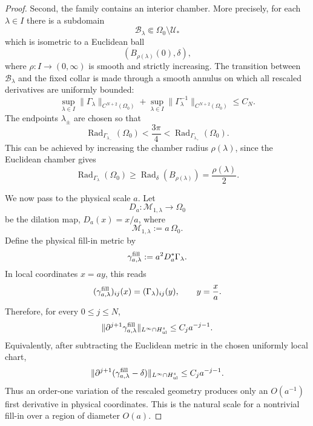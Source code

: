 \documentclass{amsart}
\begin{document}
{\begin{proof}
\noindent Second, the family contains an interior chamber. More precisely, for
each \(\lambda\in I\) there is a subdomain
\[
        \mathcal B_\lambda\Subset \Omega_0\setminus\mathcal U_*
\]
which is isometric to a Euclidean ball
\[
        (B_{\rho(\lambda)}(0),\delta),
\]
where \(\rho:I\to(0,\infty)\) is smooth and strictly increasing. The
transition between \(\mathcal B_\lambda\) and the fixed collar is made
through a smooth annulus on which all rescaled derivatives are uniformly
bounded:
\begin{equation}
\label{eq:model-uniform-bounds}
        \sup_{\lambda\in I}
        \|\Gamma_\lambda\|_{C^{N+2}(\Omega_0)}
        +
        \sup_{\lambda\in I}
        \|\Gamma_\lambda^{-1}\|_{C^{N+2}(\Omega_0)}
        \le C_N .
\end{equation}
The endpoints \(\lambda_\pm\) are chosen so that
\begin{equation}
\label{eq:model-radius-crossing}
        \operatorname{Rad}_{\Gamma_{\lambda_-}}(\Omega_0)
        <
        \frac{3\pi}{4}
        <
        \operatorname{Rad}_{\Gamma_{\lambda_+}}(\Omega_0).
\end{equation}
This can be achieved by increasing the chamber radius
\(\rho(\lambda)\), since the Euclidean chamber gives
\[
        \operatorname{Rad}_{\Gamma_\lambda}(\Omega_0)
        \ge
        \operatorname{Rad}_{\delta}(B_{\rho(\lambda)})
        =
        \frac{\rho(\lambda)}{2}.
\]

\noindent We now pass to the physical scale \(a\). Let
\[
        D_a:\mathcal M_{1,\lambda}\longrightarrow \Omega_0
\]
be the dilation map, \(D_a(x)=x/a\), where
\[
        \mathcal M_{1,\lambda}:=a\,\Omega_0 .
\]
Define the physical fill-in metric by
\begin{equation}
\label{eq:physical-fill-in-definition}
        \gamma^{\rm fill}_{a,\lambda}
        :=
        a^2D_a^*\Gamma_\lambda .
\end{equation}
In local coordinates \(x=ay\), this reads
\[
        (\gamma^{\rm fill}_{a,\lambda})_{ij}(x)
        =
        (\Gamma_\lambda)_{ij}(y),
        \qquad y=\frac{x}{a}.
\]
Therefore, for every \(0\le j\le N\),
\begin{equation}
\label{eq:fill-in-derivative-estimate}
        \|\partial^{j+1}
        \gamma^{\rm fill}_{a,\lambda}\|_{L^\infty\cap H^s_{\rm ul}}
        \le C_j a^{-j-1}.
\end{equation}
Equivalently, after subtracting the Euclidean metric in the chosen
uniformly local chart,
\begin{equation}
\label{eq:fill-in-minus-euclidean}
        \|\partial^{j+1}
        (\gamma^{\rm fill}_{a,\lambda}-\delta)\|_{L^\infty\cap H^s_{\rm ul}}
        \le C_j a^{-j-1}.
\end{equation}
Thus an order-one variation of the rescaled geometry produces only an
\(O(a^{-1})\) first derivative in physical coordinates. This is the
natural scale for a nontrivial fill-in over a region of diameter
\(O(a)\).


\end{proof}}
\end{document}
